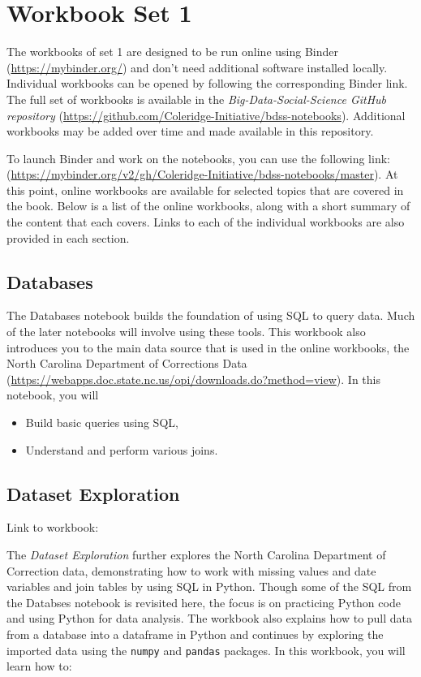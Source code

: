 \documentclass[]{krantz}
\begin{document}
\section{Workbook Set 1}\label{workbook-set-1}

The workbooks of set 1 are designed to be run online using Binder
(\url{https://mybinder.org/}) and don't need additional software
installed locally. Individual workbooks can be opened by following the
corresponding Binder link. The full set of workbooks is available in the
\emph{Big-Data-Social-Science GitHub repository}
(\url{https://github.com/Coleridge-Initiative/bdss-notebooks}).
Additional workbooks may be added over time and made available in this
repository.

To launch Binder and work on the notebooks, you can use the following
link:
(\url{https://mybinder.org/v2/gh/Coleridge-Initiative/bdss-notebooks/master}).
At this point, online workbooks are available for selected topics that
are covered in the book. Below is a list of the online workbooks, along
with a short summary of the content that each covers. Links to each of
the individual workbooks are also provided in each section.

\hypertarget{databases}{\subsection{Databases}\label{databases}}

The Databases notebook builds the foundation of using SQL to query data.
Much of the later notebooks will involve using these tools. This
workbook also introduces you to the main data source that is used in the
online workbooks, the North Carolina Department of Corrections Data
(\url{https://webapps.doc.state.nc.us/opi/downloads.do?method=view}). In
this notebook, you will

\begin{itemize}
\item
  Build basic queries using SQL,
\item
  Understand and perform various joins.
\end{itemize}

\subsection{Dataset Exploration}\label{dataset-exploration}

Link to workbook:

The \emph{Dataset Exploration} further explores the North Carolina
Department of Correction data, demonstrating how to work with missing
values and date variables and join tables by using SQL in Python. Though
some of the SQL from the Databses notebook is revisited here, the focus
is on practicing Python code and using Python for data analysis. The
workbook also explains how to pull data from a database into a dataframe
in Python and continues by exploring the imported data using the
\texttt{numpy} and \texttt{pandas} packages. In this workbook, you will
learn how to:
\end{document}
